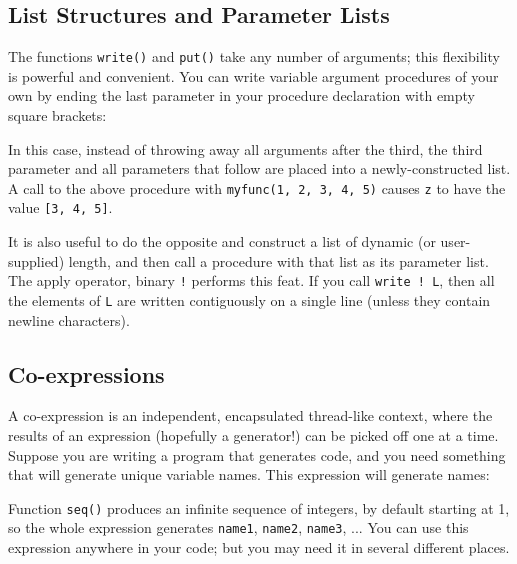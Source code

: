 \subsection{List Structures and Parameter Lists}

The functions \texttt{write()} and \texttt{put()} take any number of
arguments; this flexibility is powerful and convenient.
You can write variable argument
procedures of your own by ending the last parameter in your procedure
declaration with empty square brackets:


\noindent
In this case, instead of throwing away all arguments after the third,
the third parameter and all parameters that follow are placed into a
newly-constructed list. A call to the above procedure with
\texttt{myfunc(1, 2, 3, 4, 5)} causes \texttt{z} to have the value
\texttt{[3, 4, 5]}.

It is also useful to do the opposite and construct a list
of dynamic (or user-supplied) length, and then call a
procedure with that list as its parameter list. The
apply operator, binary
\texttt{!} performs this feat. If you call \texttt{write ! L}, then all
the elements of \texttt{L} are written contiguously on a single line
(unless they contain newline characters).

\subsection{Co-expressions}

A co-expression is an independent, encapsulated
thread{}-like context, where the results of an expression
(hopefully a generator!) can be picked off one at a time.
Suppose you are writing a program that generates
code, and you need something that will generate unique variable names.
This expression will generate names:


\noindent
Function \texttt{seq()} produces an infinite sequence
of integers, by default starting at 1, so the whole expression
generates \texttt{{\textquotedbl}name1{\textquotedbl}},
\texttt{{\textquotedbl}name2{\textquotedbl}},
\texttt{{\textquotedbl}name3{\textquotedbl}}, ... You can
use this expression anywhere in your code; but you may need
it in several different places.

